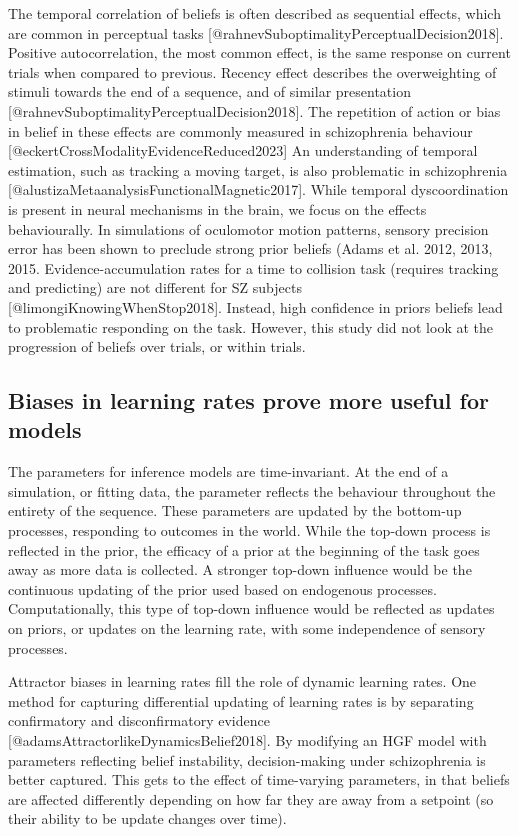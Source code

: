 \documentclass{article}
\begin{document}
The temporal correlation of beliefs is often described as sequential effects, which are common in perceptual tasks [@rahnevSuboptimalityPerceptualDecision2018]. Positive autocorrelation, the most common effect, is the same response on current trials when compared to previous. Recency effect describes the overweighting of stimuli towards the end of a sequence, and of similar presentation [@rahnevSuboptimalityPerceptualDecision2018]. The repetition of action or bias in belief in these effects are commonly measured in schizophrenia behaviour [@eckertCrossModalityEvidenceReduced2023]
An understanding of temporal estimation, such as tracking a moving target, is also problematic in schizophrenia [@alustizaMetaanalysisFunctionalMagnetic2017]. While temporal dyscoordination is present in neural mechanisms in the brain, we focus on the effects behaviourally. In simulations of oculomotor motion patterns, sensory precision error has been shown to preclude strong prior beliefs (Adams et al. 2012, 2013, 2015. Evidence-accumulation rates for a time to collision task (requires tracking and predicting) are not different for SZ subjects [@limongiKnowingWhenStop2018]. Instead, high confidence in priors beliefs lead to problematic responding on the task. However, this study did not look at the progression of beliefs over trials, or within trials.

\subsection{Biases in learning rates prove more useful for models}

The parameters for inference models are time-invariant. At the end of a simulation, or fitting data, the parameter reflects the behaviour throughout the entirety of the sequence. These parameters are updated by the bottom-up processes, responding to outcomes in the world. While the top-down process is reflected in the prior, the efficacy of a prior at the beginning of the task goes away as more data is collected. A stronger top-down influence would be the continuous updating of the prior used based on endogenous processes. Computationally, this type of top-down influence would be reflected as updates on priors, or updates on the learning rate, with some independence of sensory processes. 

Attractor biases in learning rates fill the role of dynamic learning rates.
One method for capturing differential updating of learning rates is by separating confirmatory and disconfirmatory evidence [@adamsAttractorlikeDynamicsBelief2018]. By modifying an HGF model with parameters reflecting belief instability, decision-making under schizophrenia is better captured. This gets to the effect of time-varying parameters, in that beliefs are affected differently depending on how far they are away from a setpoint (so their ability to be update changes over time).
\end{document}
